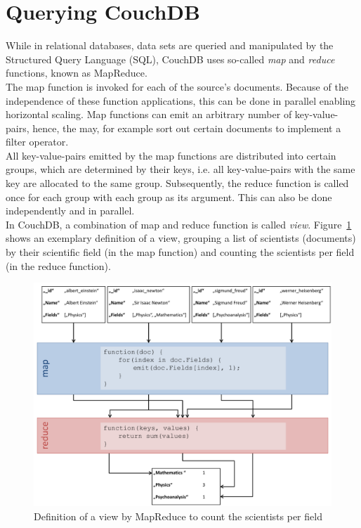 \section{Querying CouchDB}
\label{couchdb:query}
While in relational databases, data sets are queried and manipulated by the Structured Query Language (SQL), CouchDB uses so-called \emph{map} and \emph{reduce} functions, known as MapReduce.\\
The map function is invoked for each of the source's documents. Because of the independence of these function applications, this can be done in parallel enabling horizontal scaling. Map functions can emit an arbitrary number of key-value-pairs, hence, the may, for example sort out certain documents to implement a filter operator.\\
All key-value-pairs emitted by the map functions are distributed into certain groups, which are determined by their keys, i.e. all key-value-pairs with the same key are allocated to the same group. Subsequently, the reduce function is called once for each group with each group as its argument. This can also be done independently and in parallel.\\
In CouchDB, a combination of map and reduce function is called \emph{view}. Figure~\ref{img:mapreduce} shows an exemplary definition of a view, grouping a list of scientists (documents) by their scientific field (in the map function) and counting the scientists per field (in the reduce function).
\begin{figure}[h!]
\centering
\includegraphics[width=1.0\columnwidth]{images/mapreduce.pdf}
\caption{Definition of a view by MapReduce to count the scientists per field}
\label{img:mapreduce}
\end{figure}

